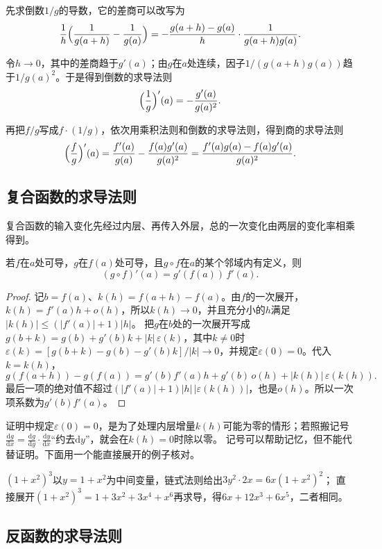 先求倒数$1/g$的导数，它的差商可以改写为
\[
 \frac1h\Bigl(\frac1{g(a+h)}-\frac1{g(a)}\Bigr)=-\frac{g(a+h)-g(a)}h\cdot\frac1{g(a+h)g(a)}.
\]

令$h\to0$，其中的差商趋于$g'(a)$；由$g$在$a$处连续，因子$1/(g(a+h)g(a))$趋于$1/g(a)^2$。于是得到倒数的求导法则
\[
 \Bigl(\frac1g\Bigr)'(a)=-\frac{g'(a)}{g(a)^2}.
\]

再把$f/g$写成$f\cdot(1/g)$，依次用乘积法则和倒数的求导法则，得到商的求导法则
\[
 \Bigl(\frac fg\Bigr)'(a)=\frac{f'(a)}{g(a)}-\frac{f(a)g'(a)}{g(a)^2}=\frac{f'(a)g(a)-f(a)g'(a)}{g(a)^2}.
\]

\subsection{复合函数的求导法则}
\label{sec:ru-chain-rule}

复合函数的输入变化先经过内层、再传入外层，总的一次变化由两层的变化率相乘得到。
\begin{theorem}[链式法则]
\label{thm:ru-chain-rule}
若$f$在$a$处可导，$g$在$f(a)$处可导，且$g\circ f$在$a$的某个邻域内有定义，则
\begin{equation}
 (g\circ f)'(a)=g'(f(a))\,f'(a).
 \label{eq:analysis-scalar-chain-rule}
\end{equation}
\end{theorem}
\begin{proof}
记$b=f(a)$、$k(h)=f(a+h)-f(a)$。由$f$的一次展开，$k(h)=f'(a)h+o(h)$，所以$k(h)\to0$，并且充分小的$h$满足$|k(h)|\leq(|f'(a)|+1)|h|$。
把$g$在$b$处的一次展开写成$g(b+k)=g(b)+g'(b)k+|k|\,\varepsilon(k)$，其中$k\neq0$时$\varepsilon(k)=[g(b+k)-g(b)-g'(b)k]/|k|\to0$，并规定$\varepsilon(0)=0$。代入$k=k(h)$，
\[
 g(f(a+h))-g(f(a))=g'(b)f'(a)h+g'(b)\,o(h)+|k(h)|\,\varepsilon(k(h)).
\]
最后一项的绝对值不超过$(|f'(a)|+1)|h|\,|\varepsilon(k(h))|$，也是$o(h)$。所以一次项系数为$g'(b)f'(a)$。
\end{proof}
证明中规定$\varepsilon(0)=0$，是为了处理内层增量$k(h)$可能为零的情形；若照搬记号$\frac{\mathrm dg}{\mathrm dx}=\frac{\mathrm dg}{\mathrm dy}\cdot\frac{\mathrm dy}{\mathrm dx}$“约去$\mathrm dy$”，就会在$k(h)=0$时除以零。
记号可以帮助记忆，但不能代替证明。下面用一个能直接展开的例子核对。
\begin{example}[用展开核对链式法则]
\label{ex:ru-chain-rule-check}
$(1+x^2)^3$以$y=1+x^2$为中间变量，链式法则给出$3y^2\cdot2x=6x(1+x^2)^2$；
直接展开$(1+x^2)^3=1+3x^2+3x^4+x^6$再求导，得$6x+12x^3+6x^5$，二者相同。
\end{example}

\subsection{反函数的求导法则}
\label{sec:ru-inverse-derivative}

